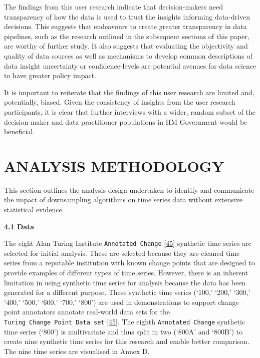 \documentclass{article}
\begin{document}
The findings from this user research indicate that decision-makers need
transparency of how the data is used to trust the insights informing
data-driven decisions. This suggests that endeavours to create greater
transparency in data pipelines, such as the research outlined in the
subsequent sections of this paper, are worthy of further study. It also
suggests that evaluating the objectivity and quality of data sources as
well as mechanisms to develop common descriptions of data insight
uncertainty or confidence-levels are potential avenues for data science
to have greater policy impact.

It is important to reiterate that the findings of this user research are
limited and, potentially, biased. Given the consistency of insights from
the user research participants, it is clear that further interviews with
a wider, random subset of the decision-maker and data practitioner
populations in HM Government would be beneficial.

\hypertarget{analysis-methodology}{%
\section{ANALYSIS METHODOLOGY}\label{analysis-methodology}}

This section outlines the analysis design undertaken to identify and
communicate the impact of downsampling algorithms on time series data
without extensive statistical evidence.

\textbf{4.1 Data}

The eight Alan Turing Institute \texttt{Annotated\ Change}
\protect\hyperlink{ref-ATIChangePoint}{{[}45{]}} synthetic time series
are selected for initial analysis. These are selected because they are
cleaned time series from a reputable institution with known change
points that are designed to provide examples of different types of time
series. However, there is an inherent limitation in using synthetic time
series for analysis because the data has been generated for a different
purpose. These synthetic time series (`100,' `200,' `300,' `400,' `500,'
`600,' `700,' `800') are used in demonstrations to support change point
annotators annotate real-world data sets for the
\texttt{Turing\ Change\ Point\ Data\ set}
\protect\hyperlink{ref-ATIChangePoint}{{[}45{]}}. The eighth
\texttt{Annotated\ Change} synthetic time series (`800') is multivariate
and thus split in two (`800A' and `800B') to create nine synthetic time
series for this research and enable better comparison. The nine time
series are visualised in Annex D.
\end{document}
